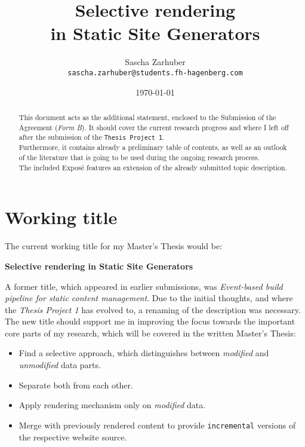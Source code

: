 \documentclass[a4paper,english,11pt]{article}
\author{
Sascha Zarhuber\\ 
\texttt{sascha.zarhuber@students.fh-hagenberg.com}
}
\title{Selective rendering\\
in Static Site Generators}
\date{\today}
\begin{document}
\maketitle

\begin{abstract}
This document acts as the additional statement, enclosed to the Submission of the Agreement (\emph{Form B}). It should cover the current research progress and where I left off after the submission of the \texttt{Thesis Project 1}.\\
Furthermore, it contains already a preliminary table of contents, as well as an outlook of the literature that is going to be used during the ongoing research process.\\
The included Expos\'{e} features an extension of the already submitted topic description.
\end{abstract}


\section{Working title}
The current working title for my Master's Thesis would be:

\begin{center}
\textbf{Selective rendering in Static Site Generators}
\end{center}

A former title, which appeared in earlier submissions, was \emph{Event-based build pipeline for static content management}. Due to the initial thoughts, and where the \emph{Thesis Project 1} has evolved to, a renaming of the description was necessary.\\
The new title should support me in improving the focus towards the important core parts of my research, which will be covered in the written Master's Thesis:
\begin{itemize}
	\item Find a selective approach, which distinguishes between \emph{modified} and \emph{unmodified} data parts.
	\item Separate both from each other.
	\item Apply rendering mechanism only on \emph{modified} data.
	\item Merge with previously rendered content to provide \texttt{incremental} versions of the respective website source.
\end{itemize}
\end{document}
